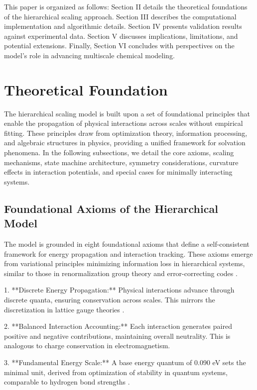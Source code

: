 \documentclass[twocolumn,prd,amsmath,amssymb,aps,superscriptaddress,nofootinbib]{revtex4-2}
\begin{document}
This paper is organized as follows: Section II details the theoretical foundations of the hierarchical scaling approach. Section III describes the computational implementation and algorithmic details. Section IV presents validation results against experimental data. Section V discusses implications, limitations, and potential extensions. Finally, Section VI concludes with perspectives on the model's role in advancing multiscale chemical modeling.

\section{Theoretical Foundation}

The hierarchical scaling model is built upon a set of foundational principles that enable the propagation of physical interactions across scales without empirical fitting. These principles draw from optimization theory, information processing, and algebraic structures in physics, providing a unified framework for solvation phenomena. In the following subsections, we detail the core axioms, scaling mechanisms, state machine architecture, symmetry considerations, curvature effects in interaction potentials, and special cases for minimally interacting systems.

\subsection{Foundational Axioms of the Hierarchical Model}

The model is grounded in eight foundational axioms that define a self-consistent framework for energy propagation and interaction tracking. These axioms emerge from variational principles minimizing information loss in hierarchical systems, similar to those in renormalization group theory \cite{Wilson1975} and error-correcting codes \cite{Shannon1948}.

1. **Discrete Energy Propagation:** Physical interactions advance through discrete quanta, ensuring conservation across scales. This mirrors the discretization in lattice gauge theories \cite{Wilson1974}.

2. **Balanced Interaction Accounting:** Each interaction generates paired positive and negative contributions, maintaining overall neutrality. This is analogous to charge conservation in electromagnetism.

3. **Fundamental Energy Scale:** A base energy quantum of 0.090 eV sets the minimal unit, derived from optimization of stability in quantum systems, comparable to hydrogen bond strengths \cite{Jeffrey1997}.
\end{document}
